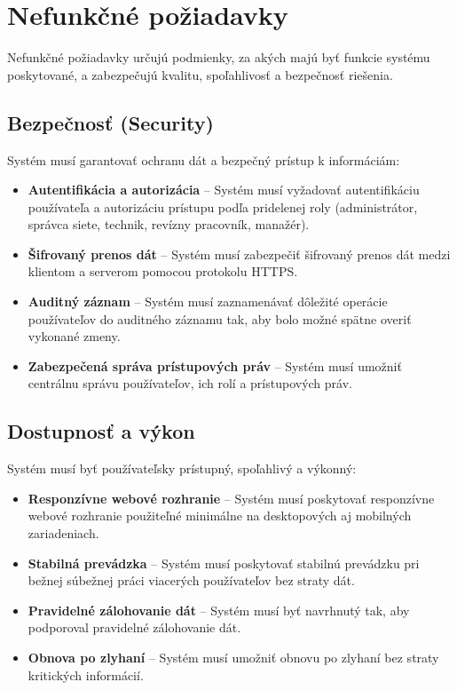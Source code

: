 \section{Nefunkčné požiadavky}

Nefunkčné požiadavky určujú podmienky, za akých majú byť funkcie systému poskytované, a zabezpečujú kvalitu, spoľahlivosť a bezpečnosť riešenia.

\subsection{Bezpečnosť (Security)}

Systém musí garantovať ochranu dát a bezpečný prístup k informáciám:

\begin{itemize}
    \item \textbf{Autentifikácia a autorizácia} -- Systém musí vyžadovať autentifikáciu používateľa a autorizáciu prístupu podľa pridelenej roly (administrátor, správca siete, technik, revízny pracovník, manažér).
    \item \textbf{Šifrovaný prenos dát} -- Systém musí zabezpečiť šifrovaný prenos dát medzi klientom a serverom pomocou protokolu HTTPS.
    \item \textbf{Auditný záznam} -- Systém musí zaznamenávať dôležité operácie používateľov do auditného záznamu tak, aby bolo možné spätne overiť vykonané zmeny.
    \item \textbf{Zabezpečená správa prístupových práv} -- Systém musí umožniť centrálnu správu používateľov, ich rolí a prístupových práv.
\end{itemize}

\subsection{Dostupnosť a výkon}

Systém musí byť používateľsky prístupný, spoľahlivý a výkonný:

\begin{itemize}
    \item \textbf{Responzívne webové rozhranie} -- Systém musí poskytovať responzívne webové rozhranie použiteľné minimálne na desktopových aj mobilných zariadeniach.
    \item \textbf{Stabilná prevádzka} -- Systém musí poskytovať stabilnú prevádzku pri bežnej súbežnej práci viacerých používateľov bez straty dát.
    \item \textbf{Pravidelné zálohovanie dát} -- Systém musí byť navrhnutý tak, aby podporoval pravidelné zálohovanie dát.
    \item \textbf{Obnova po zlyhaní} -- Systém musí umožniť obnovu po zlyhaní bez straty kritických informácií.
\end{itemize}

